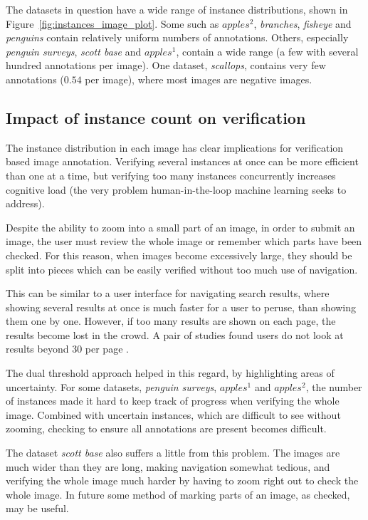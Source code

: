 The datasets in question have a wide range of instance distributions, shown in Figure~\ref{fig:instances_image_plot}. Some such as $apples^2$, \emph{branches}, \emph{fisheye} and \emph{penguins} contain relatively uniform numbers of annotations. Others, especially \emph {penguin surveys}, \emph{scott base} and $apples^1$, contain a wide range (a few with several hundred annotations per image). One dataset, \emph{scallops}, contains very few annotations ($0.54$ per image), where most images are negative images.

\subsection {Impact of instance count on verification}
\label{sec:impact_instances}

The instance distribution in each image has clear implications for verification based image annotation. Verifying several instances at once can be more efficient than one at a time, but verifying too many instances concurrently increases cognitive load (the very problem human-in-the-loop machine learning seeks to address). 

Despite the ability to zoom into a small part of an image, in order to submit an image, the user must review the whole image or remember which parts have been checked. For this reason, when images become excessively large, they should be split into pieces which can be easily verified without too much use of navigation.

This can be similar to a user interface for navigating search results, where showing several results at once is much faster for a user to peruse, than showing them one by one. However, if too many results are shown on each page, the results become lost in the crowd. A pair of studies found users do not look at results beyond 30 per page \cite{PunchoojitLumpapun2017, Zhou2007}.

The dual threshold approach helped in this regard, by highlighting areas of uncertainty. For some datasets, \emph{penguin surveys}, $apples^1$ and $apples^2$, the number of instances made it hard to keep track of progress when verifying the whole image. Combined with uncertain instances, which are difficult to see without zooming, checking to ensure all annotations are present becomes difficult.

The dataset \emph{scott base} also suffers a little from this problem. The images are much wider than they are long, making navigation somewhat tedious, and verifying the whole image much harder by having to zoom right out to check the whole image. In future some method of marking parts of an image, as checked, may be useful.

